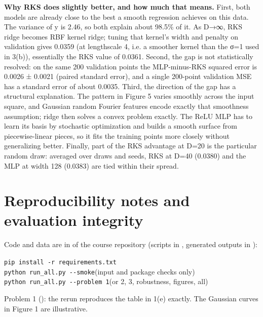 \documentclass[10pt,letterpaper]{article}
\begin{document}
\textbf{Why RKS does slightly better, and how much that means.} First,
both models are already close to the best a smooth regression achieves
on this data. The variance of y is 2.46, so both explain about 98.5\% of
it. As D→∞, RKS ridge becomes RBF kernel ridge; tuning that kernel's
width and penalty on validation gives 0.0359 (at lengthscale 4, i.e. a
smoother kernel than the σ=1 used in 3(b)), essentially the RKS value of
0.0361. Second,
the gap is not statistically resolved: on the same 200 validation points
the MLP-minus-RKS squared error is 0.0026 ± 0.0021 (paired standard
error), and a single 200-point validation MSE has a standard error of
about 0.0035. Third, the direction of the gap has a structural
explanation. The pattern in Figure 5 varies smoothly across the input
square, and Gaussian random
Fourier features encode exactly that smoothness assumption; ridge then
solves a convex problem exactly. The ReLU MLP has to learn its basis by
stochastic optimization and builds a smooth surface from piecewise-linear
pieces, so it fits the training points more closely without generalizing
better. Finally, part of the RKS advantage at D=20 is the particular
random draw: averaged over draws and seeds, RKS at D=40 (0.0380) and the
MLP at width 128 (0.0383) are tied within their spread.

\section{Reproducibility notes and evaluation
integrity}\label{reproducibility-notes-and-evaluation-integrity}

Code and data are in  of the course repository
(scripts in , generated outputs in ):

\hspace*{1.2em}\texttt{pip install -r requirements.txt}\\
\hspace*{1.2em}\texttt{python run\_all.py -{}-smoke}\hfill{\small(input and package checks only)}\hspace*{1.2em}\\
\hspace*{1.2em}\texttt{python run\_all.py -{}-problem 1}\hfill{\small(or 2, 3, robustness, figures, all)}\hspace*{1.2em}

Problem 1 (): the rerun reproduces the
table in 1(e) exactly. The Gaussian curves in Figure 1 are illustrative.
\end{document}
